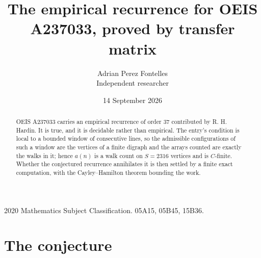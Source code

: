 \documentclass[11pt,a4paper]{article}
\title{The empirical recurrence for OEIS A237033, proved by transfer matrix}
\author{Adrian Perez Fontelles\\ \small Independent researcher}
\date{14 September 2026}
\theoremstyle{plain}
\theoremstyle{definition}
\begin{document}
\maketitle

\begin{abstract}
OEIS A237033 carries an empirical recurrence of order $37$ contributed by R. H. Hardin. It is
true, and it is decidable rather than empirical. The entry's condition is local to a bounded window of consecutive lines, so
the admissible configurations of such a window are the vertices of a finite digraph and the
arrays counted are exactly the walks in it; hence $a(n)$ is a walk count on $S=2316$ vertices
and is $C$-finite. Whether the conjectured recurrence annihilates it is then settled by a
finite exact computation, with the Cayley--Hamilton theorem bounding the work.
\end{abstract}

\noindent\small 2020 Mathematics Subject Classification. 05A15, 05B45, 15B36.\normalsize

\section{The conjecture}
\end{document}
